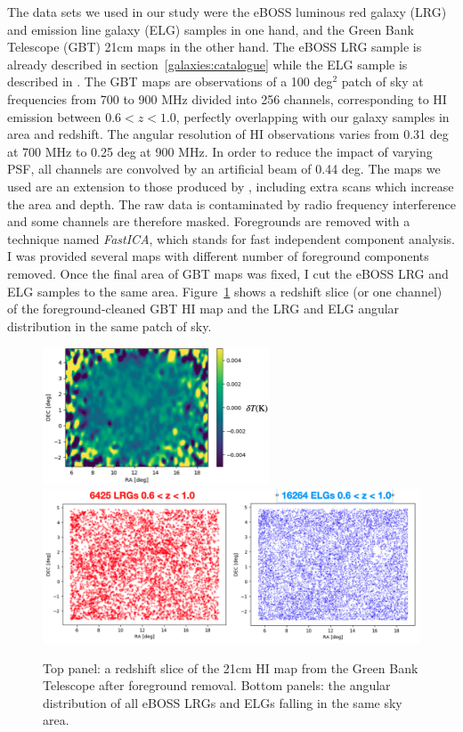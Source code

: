 The data sets we used in our study were
the eBOSS luminous red galaxy (LRG) and emission line galaxy (ELG) samples in one hand, 
and the Green Bank Telescope (GBT) 21cm maps in the other hand.
The eBOSS LRG sample is already described in section~\ref{galaxies:catalogue} while the
ELG sample is described in \cite{raichoorCompletedSDSSIVExtended2020}. 
The GBT maps are observations of a 100 deg$^2$ patch of sky at frequencies from 700 to 900 MHz divided into 256 channels, 
corresponding to HI emission between $0.6 < z < 1.0$, perfectly overlapping with our galaxy samples in area and redshift. 
The angular resolution of HI observations varies from 0.31 deg at 700 MHz to 0.25 deg at 900 MHz. 
In order to reduce the impact of varying PSF, all channels are convolved by an artificial beam of 0.44 deg. 
The maps we used are an extension to those produced by \cite{masuiMeasurement21Cm2013}, including extra scans
which increase the area and depth. 
The raw data is contaminated by radio frequency interference and some channels are therefore masked. 
Foregrounds are removed with a technique named \emph{FastICA}, which stands for fast independent 
component analysis. I was provided several maps with different number of foreground components removed.
Once the final area of GBT maps was fixed, I cut the eBOSS LRG and ELG samples to the same area. 
Figure~\ref{fig:gbt_footprint} shows a redshift slice (or one channel) of the foreground-cleaned GBT HI map
and the LRG and ELG angular distribution in the same patch of sky. 

\begin{figure}
    \centering 
    \includegraphics[width=0.6\textwidth]{fig/galaxies/gbt_map.png}
    \includegraphics[width=\textwidth]{fig/galaxies/gbt_eboss_galaxies.png}
    \caption{Top panel: a redshift slice of the 21cm HI map from the Green Bank Telescope after foreground removal. 
    Bottom panels: the angular distribution of all eBOSS LRGs and ELGs falling in the same sky area. }
    \label{fig:gbt_footprint}
\end{figure}

